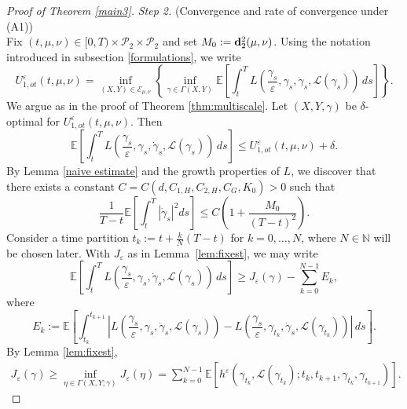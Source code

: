 \documentclass[reqno,11pt]{amsart}
\numberwithin{equation}{section}
\newcommand{\be}{\begin{equation}}
\newcommand{\ee}{\end{equation}}
\newcommand{\e}{\varepsilon}
\newcommand{\nd}{\noindent}
\begin{document}
\begin{proof}[Proof of Theorem \ref{main3}]
    \nd
    \textit{Step 2.} (Convergence and rate of convergence under (A1))\\[0.3ex]
    Fix $(t,\mu,\nu)\in [0,T)\times\mathcal{P}_2\times\mathcal{P}_2$ and set $M_0:={\bf d}_2^2(\mu,\nu)$. Using the notation introduced in subsection \ref{formulations}, we write
    $$U^\e_{1,ot}(t,\mu,\nu)=\inf_{(X, Y) \in \mathcal{E}_{\mu,\nu}} \left\{ \inf_{\gamma \in \Gamma(X, Y)} \mathbb{E}\left[\int_{t}^T L\left( \frac{\gamma_s}{\e}, \gamma_s, \dot{\gamma}_s, \mathcal{L}(\gamma_s) \right)\, ds \right] \right\}.$$
    We argue as in the proof of Theorem \ref{thm:multiscale}. Let $(X,Y,\gamma)$ be $\delta$-optimal for $U^\e_{1,ot}(t,\mu,\nu)$. Then
\begin{equation}\label{eqn:nopuepot}
 \mathbb{E}\left[\int_{t}^T L\left( \frac{\gamma_s}{\e}, \gamma_s, \dot{\gamma}_s, \mathcal{L}(\gamma_s) \right)\, ds \right] \leq U^\e_{1,ot}(t, \mu,\nu)+\delta.
\end{equation}
By Lemma \ref{naive estimate} and the growth properties of $L$, we discover that there exists a constant $C=C(d, C_{1,H},C_{2,H},C_G, K_0)>0$ such that
\be\label{gammaineq}
\frac{1}{T-t}\mathbb{E}\left[\int_t^T|\dot{\gamma}_s|^2ds   \right]\le C\left(1+\frac{M_0}{(T-t)^2}\right).
\ee
Consider a time partition $t_k := t + \frac{k}{N}(T-t)$ for $ k=0,\dots,N$, where $N \in \mathbb{N}$ will be chosen later. With $J_\e$ as in Lemma~\ref{lem:fixest}, we may write
\begin{equation}\label{eqn:opfixmuot}
\mathbb{E}\left[\int_{t}^T L\left( \frac{\gamma_s}{\e}, \gamma_s, \dot{\gamma}_s, \mathcal{L}(\gamma_s) \right)\, ds \right]\geq J_\e (\gamma) - \sum_{k=0}^{N-1} E_k,
\end{equation}
where
\[
E_k:=\mathbb{E}\left[\int_{t_k}^{t_{k+1}} \left|L\left( \frac{\gamma_s}{\e}, \gamma_s, \dot{\gamma}_s, \mathcal{L}(\gamma_s) \right)-
L\left(\frac{\gamma_s}{\e}, \gamma_{t_k}, \dot{\gamma}_s, \mathcal{L}(\gamma_{t_k})\right)\right|\,ds\right]. \]
By Lemma \ref{lem:fixest},
\begin{equation}\label{eqn:tpartestot}
\begin{aligned}
J_\e(\gamma) \geq \inf_{\eta\in\Gamma(X,Y;\gamma)}
J_\e (\eta) =\sum_{k=0}^{N-1}
\mathbb E\left[h^\e\left(\gamma_{t_k}, \mathcal{L}(\gamma_{t_k}); t_k,t_{k+1},
\gamma_{t_k},\gamma_{t_{k+1}}\right)\right].
\end{aligned}
\end{equation}


\end{proof}
\end{document}
